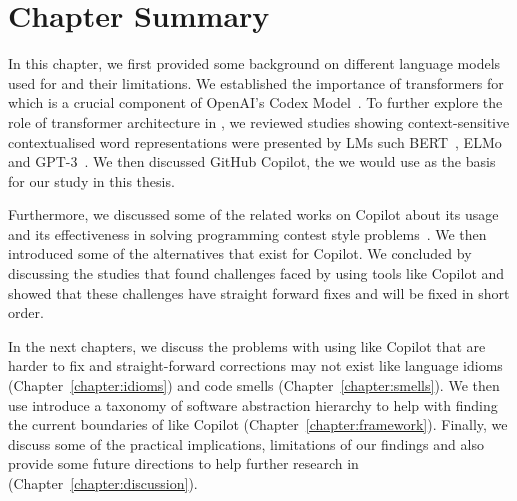 \section{Chapter Summary}
In this chapter, we first provided some background on different language models used for \cct{} and their limitations. We established the importance of transformers for \cct{} which is a crucial component of OpenAI's Codex Model~\cite{copilot}. To further explore the role of transformer architecture in \cct{}, we reviewed studies showing context-sensitive contextualised word representations were presented by LMs such BERT~\cite{bert}, ELMo~\cite{elmo} and GPT-3~\cite{Gpt3}.
We then discussed GitHub Copilot, the \cct{} we would use as the basis for our study in this thesis.

Furthermore, we discussed some of the related works on Copilot about its usage~\cite{Vaithilingam2022} and its effectiveness in solving programming contest style problems~\cite{empirical_eval}. We then introduced some of the alternatives that exist for Copilot.
We concluded by discussing the studies that found challenges faced by using \cct{} tools like Copilot and showed that these challenges have straight forward fixes and will be fixed in short order. 

In the next chapters, we discuss the problems with using \cct{} like Copilot that are harder to fix and straight-forward corrections may not exist like language idioms (Chapter~\ref{chapter:idioms}) and code smells (Chapter~\ref{chapter:smells}). 
We then use introduce a taxonomy of software abstraction hierarchy to help with finding the current boundaries of \cct{} like Copilot (Chapter~\ref{chapter:framework}). 
Finally, we discuss some of the practical implications, limitations of our findings and also provide some future directions to help further research in \cct{} (Chapter~\ref{chapter:discussion}).